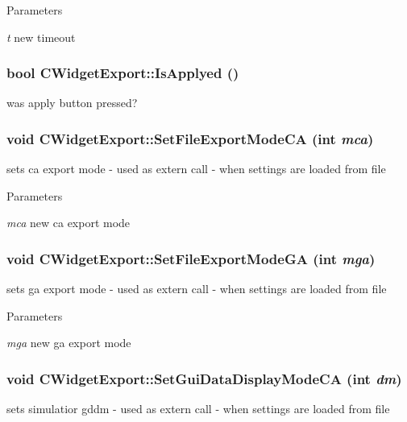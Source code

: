 \begin{DoxyParams}{Parameters}
\item[{\em t}]new timeout \end{DoxyParams}
\hypertarget{classCWidgetExport_a94317ca319054669a2a5c603cd708313}{
\subsubsection[{IsApplyed}]{\setlength{\rightskip}{0pt plus 5cm}bool CWidgetExport::IsApplyed ()}}
\label{classCWidgetExport_a94317ca319054669a2a5c603cd708313}
was apply button pressed? \hypertarget{classCWidgetExport_a913ccffd640ae0015a771e1e56757a93}{
\subsubsection[{SetFileExportModeCA}]{\setlength{\rightskip}{0pt plus 5cm}void CWidgetExport::SetFileExportModeCA (int {\em mca})}}
\label{classCWidgetExport_a913ccffd640ae0015a771e1e56757a93}
sets ca export mode -\/ used as extern call -\/ when settings are loaded from file


\begin{DoxyParams}{Parameters}
\item[{\em mca}]new ca export mode \end{DoxyParams}
\hypertarget{classCWidgetExport_a4735fe80f78a742cbf6d81312a9688a3}{
\subsubsection[{SetFileExportModeGA}]{\setlength{\rightskip}{0pt plus 5cm}void CWidgetExport::SetFileExportModeGA (int {\em mga})}}
\label{classCWidgetExport_a4735fe80f78a742cbf6d81312a9688a3}
sets ga export mode -\/ used as extern call -\/ when settings are loaded from file


\begin{DoxyParams}{Parameters}
\item[{\em mga}]new ga export mode \end{DoxyParams}
\hypertarget{classCWidgetExport_a26a3ba5025f6cb0c2f34585dc9309482}{
\subsubsection[{SetGuiDataDisplayModeCA}]{\setlength{\rightskip}{0pt plus 5cm}void CWidgetExport::SetGuiDataDisplayModeCA (int {\em dm})}}
\label{classCWidgetExport_a26a3ba5025f6cb0c2f34585dc9309482}
sets simulatior gddm -\/ used as extern call -\/ when settings are loaded from file



